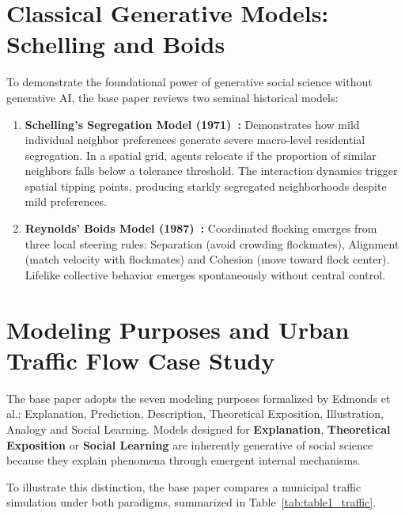 \documentclass[12pt,a4paper]{report}
\begin{document}
\section{Classical Generative Models: Schelling and Boids}
\label{sec:classic_models}

To demonstrate the foundational power of generative social science without generative AI, the base paper reviews two seminal historical models:
\begin{enumerate}[label=\arabic*.]
    \item \textbf{Schelling's Segregation Model (1971)~\cite{schelling1971dynamic}:} Demonstrates how mild individual neighbor preferences generate severe macro-level residential segregation. In a spatial grid, agents relocate if the proportion of similar neighbors falls below a tolerance threshold. The interaction dynamics trigger spatial tipping points, producing starkly segregated neighborhoods despite mild preferences.
    \item \textbf{Reynolds' Boids Model (1987)~\cite{reynolds1987flocks}:} Coordinated flocking emerges from three local steering rules: Separation (avoid crowding flockmates), Alignment (match velocity with flockmates) and Cohesion (move toward flock center). Lifelike collective behavior emerges spontaneously without central control.
\end{enumerate}

\section{Modeling Purposes and Urban Traffic Flow Case Study}
\label{sec:traffic_case}

The base paper adopts the seven modeling purposes formalized by Edmonds et al.: Explanation, Prediction, Description, Theoretical Exposition, Illustration, Analogy and Social Learning. Models designed for \textbf{Explanation}, \textbf{Theoretical Exposition} or \textbf{Social Learning} are inherently generative of social science because they explain phenomena through emergent internal mechanisms.

To illustrate this distinction, the base paper compares a municipal traffic simulation under both paradigms, summarized in Table~\ref{tab:table1_traffic}.
\end{document}
